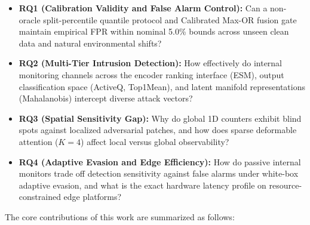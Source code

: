 \documentclass[preprint,12pt]{elsarticle}
\begin{document}
\begin{itemize}
    \item \textbf{RQ1 (Calibration Validity and False Alarm Control):} Can a non-oracle split-percentile quantile protocol and Calibrated Max-OR fusion gate maintain empirical FPR within nominal 5.0\% bounds across unseen clean data and natural environmental shifts?
    \item \textbf{RQ2 (Multi-Tier Intrusion Detection):} How effectively do internal monitoring channels across the encoder ranking interface (ESM), output classification space (ActiveQ, Top1Mean), and latent manifold representations (Mahalanobis) intercept diverse attack vectors?
    \item \textbf{RQ3 (Spatial Sensitivity Gap):} Why do global 1D counters exhibit blind spots against localized adversarial patches, and how does sparse deformable attention ($K=4$) affect local versus global observability?
    \item \textbf{RQ4 (Adaptive Evasion and Edge Efficiency):} How do passive internal monitors trade off detection sensitivity against false alarms under white-box adaptive evasion, and what is the exact hardware latency profile on resource-constrained edge platforms?
\end{itemize}

The core contributions of this work are summarized as follows:
\end{document}
